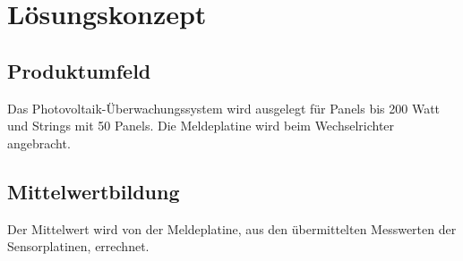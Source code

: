 \section{L\"osungskonzept}
\subsection{Produktumfeld}
Das Photovoltaik-Überwachungssystem wird ausgelegt für Panels bis 200 Watt und Strings mit 50 Panels. Die Meldeplatine wird beim Wechselrichter angebracht.
\subsection{Mittelwertbildung}
Der Mittelwert wird von der Meldeplatine, aus den übermittelten Messwerten der Sensorplatinen, errechnet. 